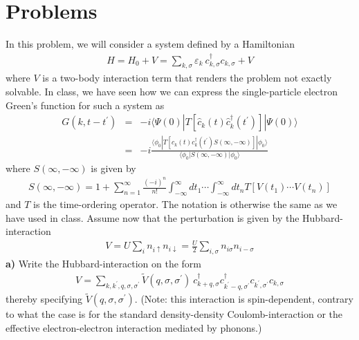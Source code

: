\section*{Problems}

\begin{problem}
In this problem, we will consider a system defined by a Hamiltonian
\begin{eqnarray}
	H = H_0 + V =  \sum_{k,\sigma} \varepsilon_k ~c^{\dagger}_{k,\sigma} c_{k,\sigma} + V \nonumber 
\end{eqnarray}
where $V$ is a two-body interaction term that renders the problem not exactly solvable.  
In class, we have seen how we can express the single-particle electron Green's function for such a system as 
\begin{eqnarray}
	G(k, t-t^{\prime}) & = & -i \langle \Psi(0) | T \left[ \hat c_{k} (t)  \hat c^{\dagger}_{k} (t^{\prime})  \right] | \Psi(0) \rangle \nonumber \\
	& = & -i \frac{ \langle \phi_0 | T \left[ c_{k} (t)  c^{\dagger}_{k} (t^{\prime})S(\infty,-\infty)  \right]| \phi_0 \rangle}{\langle  \phi_0   | S(\infty,-\infty)  |  \phi_0  \rangle } \nonumber
\end{eqnarray} 
where $S(\infty,-\infty)$ is given by
\begin{eqnarray}
	S(\infty,-\infty) = 1 + \sum_{n=1}^{\infty} \frac{(-i)^n}{n!} \int_{-\infty}^{\infty} dt_1 \cdots \int_{-\infty}^{\infty} dt_n T \left[ V(t_1) \cdots  V(t_n) \right] \nonumber 
\end{eqnarray}
and $T$ is the time-ordering operator. The notation is otherwise the same as we have used in class. Assume now that the perturbation is given by the Hubbard-interaction
\begin{eqnarray}
	V = U \sum_i n_{i \uparrow} n_{i \downarrow} =\frac{U}{2} \sum_{i,\sigma} n_{i \sigma} n_{i -\sigma}  \nonumber
\end{eqnarray}
{\bf a)} Write the Hubbard-interaction on the form 
\begin{eqnarray}
	V = \sum_{k,k^{\prime},q,\sigma,\sigma^{\prime}} \tilde V(q,\sigma,\sigma^{\prime}) ~ c^{\dagger}_{k+q,\sigma} c^{\dagger}_{k^{\prime}-q,\sigma^{\prime}}
	c_{k^{\prime},\sigma^{\prime}} c_{k,\sigma} \nonumber 
\end{eqnarray}
thereby specifying $ \tilde V(q,\sigma,\sigma^{\prime}) $. (Note: this interaction is spin-dependent, contrary to what the case is for the standard density-density Coulomb-interaction or the effective electron-electron interaction mediated by phonons.)

\end{problem}
